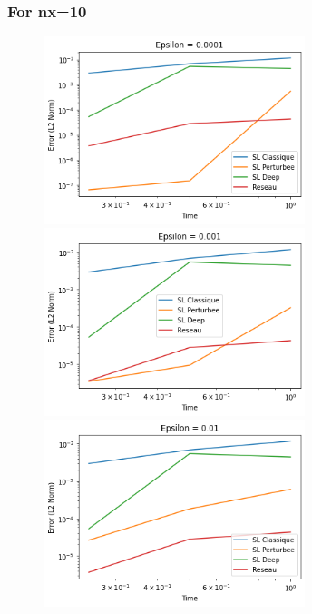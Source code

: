 \documentclass{article}
\begin{document}
\subsubsection*{For nx=10}
\begin{figure}[!h]
    \centering
    \includegraphics[width=0.68\textwidth]{images/10ep21.png}
    \includegraphics[width=0.68\textwidth]{images/10ep22.png}
    \includegraphics[width=0.68\textwidth]{images/10ep23.png}
\end{figure}
\end{document}
